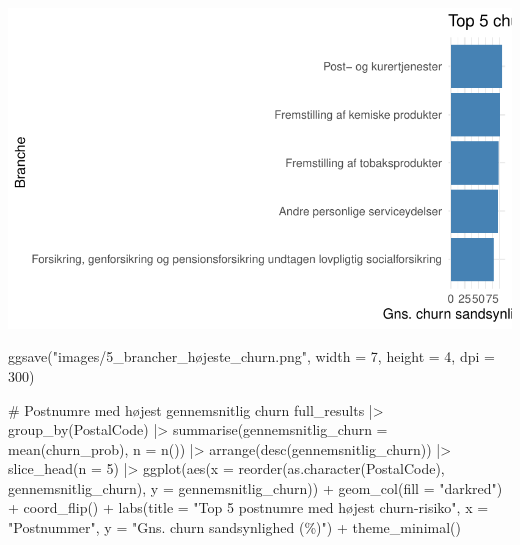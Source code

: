 \documentclass[
  11pt,
  letterpaper,
  DIV=11,
  numbers=noendperiod]{scrartcl}
\newenvironment{Shaded}{\begin{snugshade}}{\end{snugshade}}
\newcommand{\AttributeTok}[1]{\textcolor[rgb]{0.40,0.45,0.13}{#1}}
\newcommand{\CommentTok}[1]{\textcolor[rgb]{0.37,0.37,0.37}{#1}}
\newcommand{\DecValTok}[1]{\textcolor[rgb]{0.68,0.00,0.00}{#1}}
\newcommand{\FunctionTok}[1]{\textcolor[rgb]{0.28,0.35,0.67}{#1}}
\newcommand{\NormalTok}[1]{\textcolor[rgb]{0.00,0.23,0.31}{#1}}
\newcommand{\SpecialCharTok}[1]{\textcolor[rgb]{0.37,0.37,0.37}{#1}}
\newcommand{\StringTok}[1]{\textcolor[rgb]{0.13,0.47,0.30}{#1}}
\begin{document}
\includegraphics{Quarto_files/figure-pdf/unnamed-chunk-16-2.pdf}

\begin{Shaded}
\begin{Highlighting}[]
\FunctionTok{ggsave}\NormalTok{(}\StringTok{"images/5\_brancher\_højeste\_churn.png"}\NormalTok{, }\AttributeTok{width =} \DecValTok{7}\NormalTok{, }\AttributeTok{height =} \DecValTok{4}\NormalTok{, }\AttributeTok{dpi =} \DecValTok{300}\NormalTok{)}

\CommentTok{\# Postnumre med højest gennemsnitlig churn}
\NormalTok{full\_results }\SpecialCharTok{|\textgreater{}} 
  \FunctionTok{group\_by}\NormalTok{(PostalCode) }\SpecialCharTok{|\textgreater{}} 
  \FunctionTok{summarise}\NormalTok{(}\AttributeTok{gennemsnitlig\_churn =} \FunctionTok{mean}\NormalTok{(churn\_prob), }\AttributeTok{n =} \FunctionTok{n}\NormalTok{()) }\SpecialCharTok{|\textgreater{}} 
  \FunctionTok{arrange}\NormalTok{(}\FunctionTok{desc}\NormalTok{(gennemsnitlig\_churn)) }\SpecialCharTok{|\textgreater{}} 
  \FunctionTok{slice\_head}\NormalTok{(}\AttributeTok{n =} \DecValTok{5}\NormalTok{) }\SpecialCharTok{|\textgreater{}} 
  \FunctionTok{ggplot}\NormalTok{(}\FunctionTok{aes}\NormalTok{(}\AttributeTok{x =} \FunctionTok{reorder}\NormalTok{(}\FunctionTok{as.character}\NormalTok{(PostalCode), gennemsnitlig\_churn), }\AttributeTok{y =}\NormalTok{ gennemsnitlig\_churn)) }\SpecialCharTok{+}
  \FunctionTok{geom\_col}\NormalTok{(}\AttributeTok{fill =} \StringTok{"darkred"}\NormalTok{) }\SpecialCharTok{+}
  \FunctionTok{coord\_flip}\NormalTok{() }\SpecialCharTok{+}
  \FunctionTok{labs}\NormalTok{(}\AttributeTok{title =} \StringTok{"Top 5 postnumre med højest churn{-}risiko"}\NormalTok{, }\AttributeTok{x =} \StringTok{"Postnummer"}\NormalTok{, }\AttributeTok{y =} \StringTok{"Gns. churn sandsynlighed (\%)"}\NormalTok{) }\SpecialCharTok{+}
  \FunctionTok{theme\_minimal}\NormalTok{()}
\end{Highlighting}
\end{Shaded}
\end{document}
